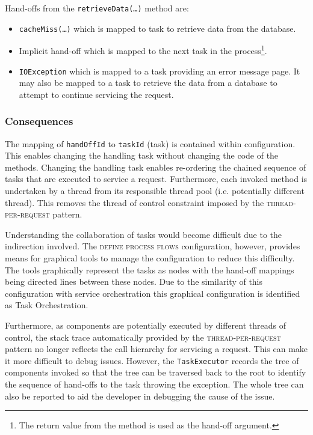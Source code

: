 \documentclass[prodmode]{style/acmlarge}
\begin{document}
Hand-offs from the \texttt{retrieveData(\ldots)} method are:
\begin{itemize}
  \item \texttt{cacheMiss(\ldots)} which is mapped to task to retrieve data from the database.
  \item Implicit hand-off which is mapped to the next task in the process\footnote{The return value from the method is used as the hand-off argument.}.
  \item \texttt{IOException} which is mapped to a task providing an error message page.  It may also be mapped to a task to retrieve the data from a database to attempt to continue servicing the request.
\end{itemize}


\subsubsection*{Consequences}

The mapping of \texttt{handOffId} to \texttt{taskId} (task) is contained within
configuration.  This enables changing the handling task without changing the
code of the methods.  Changing the handling task enables re-ordering the chained
sequence of tasks that are executed to service a request.  Furthermore, each
invoked method is undertaken by a thread from its responsible thread pool (i.e.
potentially different thread).  This removes the thread of control constraint
imposed by the \textsc{thread-per-request} pattern.

Understanding the collaboration of tasks would become difficult due to the
indirection involved.  The \textsc{define process flows} configuration, however,
provides means for graphical tools to manage the configuration to reduce this
difficulty.  The tools graphically represent the tasks as nodes with the
hand-off mappings being directed lines between these nodes.  Due to the
similarity of this configuration with service orchestration this graphical
configuration is identified as Task Orchestration.

Furthermore, as components are potentially executed by different threads of
control, the stack trace automatically provided by the
\textsc{thread-per-request} pattern no longer reflects the call hierarchy for
servicing a request.  This can make it more difficult to debug issues.  However,
the \texttt{TaskExecutor} records the tree of components invoked so that the
tree can be traversed back to the root to identify the sequence of hand-offs to
the task throwing the exception.  The whole tree can also be reported to aid the
developer in debugging the cause of the issue.
\end{document}
